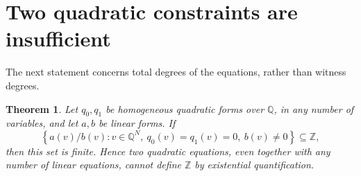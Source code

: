 \documentclass[11pt]{article}
\newtheorem{theorem}{Theorem}[section]
\theoremstyle{remark}\newtheorem{remark}[theorem]{Remark}
\newcommand{\Q}{\mathbb Q}\newcommand{\Z}{\mathbb Z}\newcommand{\R}{\mathbb R}
\begin{document}
\section{Two quadratic constraints are insufficient}

The next statement concerns total degrees of the equations, rather than witness degrees.

\begin{theorem}\label{two-quadrics}
Let \(q_0,q_1\) be homogeneous quadratic forms over \(\Q\), in any number of variables, and let \(a,b\) be linear forms. If
\[
 \left\{a(v)/b(v):v\in\Q^N,\ q_0(v)=q_1(v)=0,\ b(v)\ne0\right\}\subseteq\Z,
\]
then this set is finite. Hence two quadratic equations, even together with any number of linear equations, cannot define \(\Z\) by existential quantification.
\end{theorem}
\end{document}
